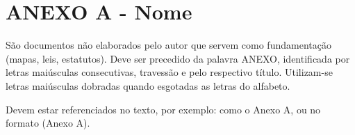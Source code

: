 \appendix

\chapter*{ANEXO A - Nome}

São documentos não elaborados pelo autor que servem como fundamentação (mapas, leis, estatutos). Deve ser precedido da palavra ANEXO, identificada por letras maiúsculas consecutivas, travessão e pelo respectivo título. Utilizam-se letras maiúsculas dobradas
quando esgotadas as letras do alfabeto.

Devem estar referenciados no texto, por exemplo: como o Anexo A, ou no formato (Anexo A).
